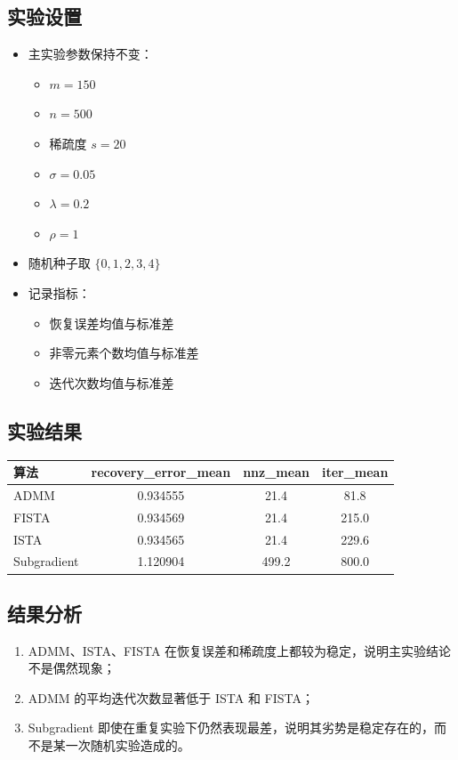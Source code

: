 \documentclass[12pt,a4paper]{ctexart}
\begin{document}
\subsection{实验设置}
\begin{itemize}[leftmargin=2em]
    \item 主实验参数保持不变：
    \begin{itemize}[leftmargin=2em]
        \item $m=150$
        \item $n=500$
        \item 稀疏度 $s=20$
        \item $\sigma=0.05$
        \item $\lambda=0.2$
        \item $\rho=1$
    \end{itemize}
    \item 随机种子取 $\{0,1,2,3,4\}$
    \item 记录指标：
    \begin{itemize}[leftmargin=2em]
        \item 恢复误差均值与标准差
        \item 非零元素个数均值与标准差
        \item 迭代次数均值与标准差
    \end{itemize}
\end{itemize}

\subsection{实验结果}
\begin{center}
\begin{tabular}{lccc}
\toprule
算法 & recovery\_error\_mean & nnz\_mean & iter\_mean \\
\midrule
ADMM & 0.934555 & 21.4 & 81.8 \\
FISTA & 0.934569 & 21.4 & 215.0 \\
ISTA & 0.934565 & 21.4 & 229.6 \\
Subgradient & 1.120904 & 499.2 & 800.0 \\
\bottomrule
\end{tabular}
\end{center}

\subsection{结果分析}
\begin{enumerate}[label=\arabic*.]
    \item ADMM、ISTA、FISTA 在恢复误差和稀疏度上都较为稳定，说明主实验结论不是偶然现象；
    \item ADMM 的平均迭代次数显著低于 ISTA 和 FISTA；
    \item Subgradient 即使在重复实验下仍然表现最差，说明其劣势是稳定存在的，而不是某一次随机实验造成的。
\end{enumerate}
\end{document}
